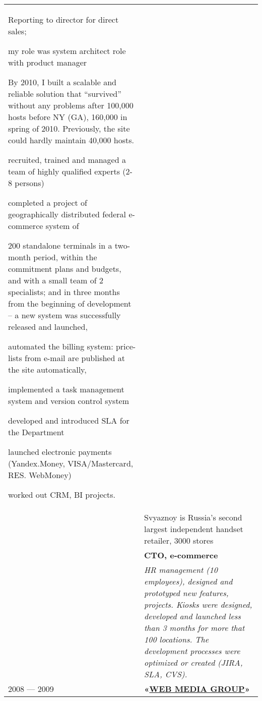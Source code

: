 \documentclass[11pt]{article}
\newif\ifdetailed
\newif\iftwopage
\begin{document}
\begin{longtable} {l | p{}}
\ifdetailed
& {\textbf{CTO, e-commerce}} {\color{gray}\small{// Reporting to Director for direct sales}}
\begin{itemize}
\iftwopage
\else
\item Reporting to director for direct sales;
\item my role was system architect role with product manager
\fi
\item By 2010, I built a scalable and reliable solution that “survived” without any problems after
100,000 hosts before NY (GA), 160,000 in spring of 2010. Previously, the site could hardly maintain 40,000 hosts.
\item recruited, trained and managed a team of highly qualified experts (2-8 persons)
\item completed a project of geographically distributed federal e-commerce system of
\item 200 standalone terminals in a two-month period, within the commitment plans and
budgets, and with a small team of 2 specialists; and in three months from the
beginning of development – a new system was successfully released and
launched,
\item automated the billing system: price-lists from e-mail are published at the site
automatically,
\item implemented a task management system and version control system
\item developed and introduced SLA for the Department
\item launched electronic payments (Yandex.Money, VISA/Mastercard, RES.
WebMoney)
\item worked out CRM, BI projects.
\end{itemize}
\\
\vspace{1.5em} & Svyaznoy is Russia’s second largest independent handset retailer, 3000 stores \\
\fi

\ifdetailed
\else
& {\textbf{CTO, e-commerce}} \\
\vspace{1em} &  {\it{HR management (10 employees),  designed and prototyped new features, projects. Kiosks were designed, developed and launched less than 3 months for more that 100 locations. The development processes were optimized or created (JIRA, SLA, CVS).
}} \\
\fi

2008 — 2009 & {\textbf{«\href{http://webmediagroup.ru}{WEB MEDIA GROUP}»}}\\


\end{longtable}
\end{document}
